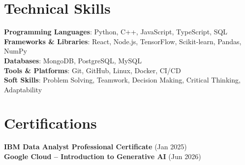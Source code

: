 \documentclass[letterpaper,11pt]{article}
\begin{document}
\section{Technical Skills}
 \begin{itemize}[leftmargin=0.15in, label={}]
    \small{\item{
     \textbf{Programming Languages}{: Python, C++, JavaScript, TypeScript, SQL} \\
     \textbf{Frameworks \& Libraries}{: React, Node.js, TensorFlow, Scikit-learn, Pandas, NumPy} \\
     \textbf{Databases}{: MongoDB, PostgreSQL, MySQL} \\
     \textbf{Tools \& Platforms}{: Git, GitHub, Linux, Docker, CI/CD} \\
     \textbf{Soft Skills}{: Problem Solving, Teamwork, Decision Making, Critical Thinking, Adaptability}
    }}
 \end{itemize}
 
\section{Certifications}
 \begin{itemize}[leftmargin=0.15in, label={}]
    \small{\item{
     \textbf{IBM Data Analyst Professional Certificate} {(Jan 2025)} \\
     \textbf{Google Cloud – Introduction to Generative AI} {(Jun 2026)}
    }}
 \end{itemize}

\end{document}
